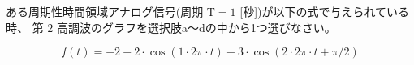 ある周期性時間領域アナログ信号(周期 $\textrm{T} = 1$ [秒])が以下の式で与えられている時、
第 $2$ 高調波のグラフを選択肢a〜dの中から1つ選びなさい。

\[
f(t) = 
-2
+ 2 \cdot \cos( 1 \cdot 2 \pi \cdot t )
+ 3 \cdot \cos( 2 \cdot 2 \pi \cdot t + \pi/2 )
\]
